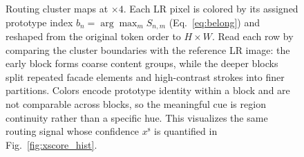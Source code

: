 \begin{figure}[t]
\centering
\figeightheader
\vspace{2pt}


\vspace{2pt}

\vspace{2pt}

\caption{Routing cluster maps at $\times4$. Each LR pixel is colored by its
assigned prototype index $b_n=\arg\max_m S_{n,m}$ (Eq.~\eqref{eq:belong}) and
reshaped from the original token order to $H\times W$. Read each row by comparing
the cluster boundaries with the reference LR image: the early block forms coarse
content groups, while the deeper blocks split repeated facade elements and
high-contrast strokes into finer partitions. Colors encode prototype identity
within a block and are not comparable across blocks, so the meaningful cue is
region continuity rather than a specific hue. This visualizes the same routing
signal whose confidence $x^{\mathrm{s}}$ is quantified in
Fig.~\ref{fig:xscore_hist}.}
\label{fig:cluster_maps}
\end{figure}
